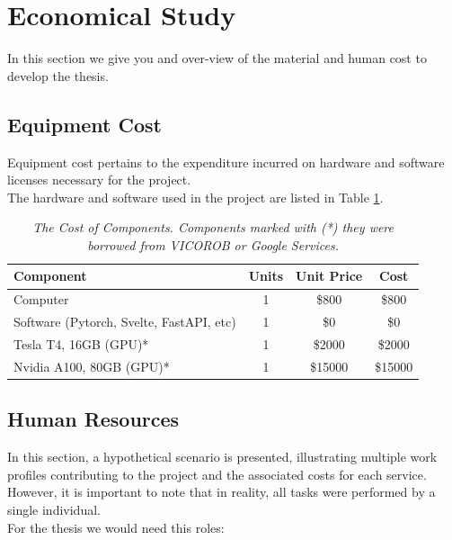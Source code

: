 \section{Economical Study}

In this section we give you and over-view of the material and human cost to
develop the thesis.

\subsection{Equipment Cost}

Equipment cost pertains to the expenditure incurred on hardware and software
licenses necessary for the project. \\

The hardware and software used in the project are listed in Table
\ref{table:equipment_cost}.

\begin{table}[H]
  \centering
  \begin{tabular}{lccc}
    \toprule
    \textbf{Component} & \textbf{Units} & \textbf{Unit Price} & \textbf{Cost} \\
    \midrule
    Computer & 1 & \$800 & \$800 \\
    Software (Pytorch, Svelte, FastAPI, etc) & 1 & \$0 & \$0 \\
    Tesla T4, 16GB (GPU)* & 1 & \$2000 & \$2000 \\
    Nvidia A100, 80GB (GPU)* & 1 & \$15000 & \$15000 \\
    \bottomrule
  \end{tabular}
  \caption[The Cost of Components.]
  {\textit{The Cost of Components.
  Components marked with (*) they were borrowed from VICOROB or
  Google Services. }}
  {\label{table:equipment_cost}}
\end{table}

\subsection{Human Resources}

In this section, a hypothetical scenario is presented, illustrating multiple
work profiles contributing to the project and the associated costs for each
service. However, it is important to note that in reality, all tasks were
performed by a single individual. \\

For the thesis we would need this roles: \\

